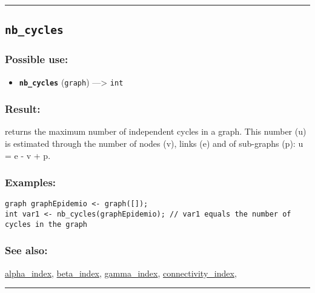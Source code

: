 \documentclass[]{book}
\providecommand{\tightlist}{%
  \setlength{\itemsep}{0pt}\setlength{\parskip}{0pt}}
\theoremstyle{definition}
\theoremstyle{definition}
\theoremstyle{definition}
\theoremstyle{remark}
\begin{document}
\begin{center}\rule{0.5\linewidth}{\linethickness}\end{center}

\subsection{\texorpdfstring{\texttt{nb\_cycles}}{nb\_cycles}}\label{nb_cycles}

\subsubsection{Possible use:}\label{possible-use-365}

\begin{itemize}
\tightlist
\item
  \textbf{\texttt{nb\_cycles}} (\texttt{graph}) ---\textgreater{}
  \texttt{int}
\end{itemize}

\subsubsection{Result:}\label{result-353}

returns the maximum number of independent cycles in a graph. This number
(u) is estimated through the number of nodes (v), links (e) and of
sub-graphs (p): u = e - v + p.

\subsubsection{Examples:}\label{examples-252}

\begin{verbatim}
graph graphEpidemio <- graph([]);  
int var1 <- nb_cycles(graphEpidemio); // var1 equals the number of cycles in the graph
\end{verbatim}

\subsubsection{See also:}\label{see-also-145}

\href{OperatorsAA\#alpha_index}{alpha\_index},
\href{OperatorsBC\#beta_index}{beta\_index},
\href{OperatorsDH\#gamma_index}{gamma\_index},
\href{OperatorsBC\#connectivity_index}{connectivity\_index},

\begin{center}\rule{0.5\linewidth}{\linethickness}\end{center}
\end{document}

